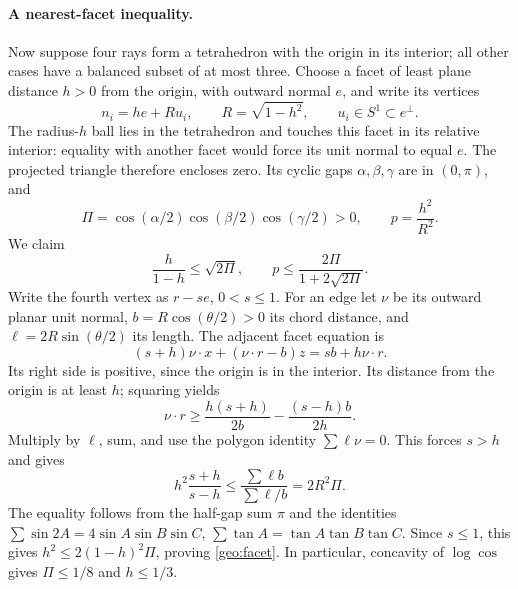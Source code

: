 \paragraph{A nearest-facet inequality.}
Now suppose four rays form a tetrahedron with the origin in its
interior; all other cases have a balanced subset of at most three.
Choose a facet of least plane distance \(h>0\) from the origin,
with outward normal \(e\), and write its vertices
\[
 n_i=he+Ru_i,\qquad R=\sqrt{1-h^2},\qquad u_i\in S^1\subset e^\perp.
\]
The radius-\(h\) ball lies in the tetrahedron and touches this facet
in its relative interior: equality with another facet would force
its unit normal to equal \(e\).
The projected triangle therefore encloses zero. Its cyclic gaps
\(\alpha,\beta,\gamma\) are in \((0,\pi)\), and
\[
 \Pi=\cos(\alpha/2)\cos(\beta/2)\cos(\gamma/2)>0,\qquad
 p=\frac{h^2}{R^2}.
\]
We claim
\begin{equation}
 \frac{h}{1-h}\le\sqrt{2\Pi},\qquad
 p\le\frac{2\Pi}{1+2\sqrt{2\Pi}}.
 \label{geo:facet}
\end{equation}
Write the fourth vertex as \(r-se\), \(0<s\le1\).
For an edge let \(\nu\) be its outward planar unit normal,
\(b=R\cos(\theta/2)>0\) its chord distance, and
\(\ell=2R\sin(\theta/2)\) its length. The adjacent facet equation is
\[
 (s+h)\nu\cdot x+(\nu\cdot r-b)z=sb+h\nu\cdot r.
\]
Its right side is positive, since the origin is in the interior.
Its distance from the origin is at least \(h\); squaring yields
\[
 \nu\cdot r\ge
 \frac{h(s+h)}{2b}-\frac{(s-h)b}{2h}.
\]
Multiply by \(\ell\), sum, and use the polygon identity
\(\sum\ell\nu=0\). This forces \(s>h\) and gives
\[
 h^2\frac{s+h}{s-h}\le\frac{\sum\ell b}{\sum\ell/b}
 =2R^2\Pi.
\]
The equality follows from the half-gap sum \(\pi\) and the identities
\(\sum\sin2A=4\sin A\sin B\sin C\),
\(\sum\tan A=\tan A\tan B\tan C\).
Since \(s\le1\), this gives \(h^2\le2(1-h)^2\Pi\), proving
\eqref{geo:facet}. In particular, concavity of \(\log\cos\) gives
\(\Pi\le1/8\) and \(h\le1/3\).

